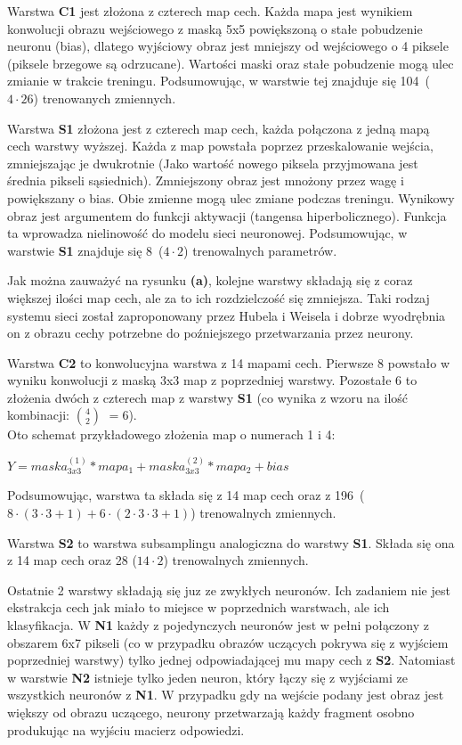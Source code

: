 \documentclass[11pt,a4paper]{article}
\begin{document}
Warstwa  \textbf {C1} jest złożona z czterech map cech. Każda mapa jest wynikiem konwolucji obrazu 
wejściowego z maską 5x5 powiększoną o stałe pobudzenie neuronu (bias), dlatego wyjściowy obraz jest 
mniejszy od wejściowego o 4 piksele (piksele brzegowe są odrzucane). Wartości maski oraz stałe 
pobudzenie mogą ulec zmianie w trakcie treningu. Podsumowując, w warstwie tej znajduje się 
104~($4  \cdot 26$) trenowanych zmiennych.

Warstwa  \textbf{S1} złożona jest z czterech map cech, każda połączona z jedną mapą cech warstwy 
wyższej. Każda z map powstała poprzez przeskalowanie wejścia, zmniejszając je dwukrotnie (Jako 
wartość nowego piksela przyjmowana jest średnia pikseli sąsiednich). Zmniejszony obraz jest mnożony 
przez wagę i powiększany o bias. Obie zmienne mogą ulec zmiane podczas treningu. Wynikowy obraz jest
argumentem do funkcji aktywacji (tangensa hiperbolicznego). Funkcja ta wprowadza nielinowość do 
modelu sieci neuronowej. Podsumowując, w warstwie \textbf{S1} znajduje się 8~($4 \cdot 2$) 
trenowalnych parametrów.

Jak można zauważyć na rysunku  \textbf{(a)}, kolejne warstwy składają się z coraz większej ilości 
map cech, ale za to ich rozdzielczość się zmniejsza. Taki rodzaj systemu sieci został zaproponowany 
przez Hubela i Weisela i dobrze wyodrębnia on z obrazu cechy potrzebne do poźniejszego przetwarzania
przez neurony.

Warstwa  \textbf{C2} to konwolucyjna warstwa z 14 mapami cech. Pierwsze 8 powstało w wyniku
konwolucji z maską 3x3 map z poprzedniej warstwy. Pozostałe 6 to złożenia dwóch z czterech map z 
warstwy \textbf{S1} (co wynika z wzoru na ilość kombinacji: $4 \choose 2$ $ = 6$).\\
Oto schemat przykładowego złożenia map o numerach 1 i 4:

\begin{center}
$Y = maska^{(1)}_{3x3}*mapa_{1}+maska^{(2)}_{3x3}*mapa_{2}+bias$
\end{center}

Podsumowując, warstwa ta składa się z 14 map cech oraz z 196~($8 \cdot (3 \cdot 3+1) + 6 \cdot (2 
\cdot 3 \cdot 3 +1)$) trenowalnych zmiennych.

Warstwa  \textbf{S2} to warstwa subsamplingu analogiczna do warstwy  \textbf{S1}. Składa się ona z
14 map cech oraz 28 ($14 \cdot 2$) trenowalnych zmiennych.

Ostatnie 2 warstwy składają się juz ze zwykłych neuronów. Ich zadaniem nie jest ekstrakcja cech jak 
miało to miejsce w poprzednich warstwach, ale ich klasyfikacja. W  \textbf{N1} każdy z pojedynczych 
neuronów jest w pełni połączony z obszarem 6x7 pikseli (co w przypadku obrazów uczących pokrywa się 
z wyjściem poprzedniej warstwy) tylko jednej odpowiadającej mu mapy cech z \textbf{S2}. Natomiast w 
warstwie  \textbf{N2} istnieje tylko jeden neuron, który łączy się z wyjściami ze wszystkich 
neuronów z \textbf{N1}. W przypadku gdy na wejście podany jest obraz jest większy od obrazu 
uczącego, neurony przetwarzają każdy fragment osobno produkując na wyjściu macierz odpowiedzi.
\end{document}
